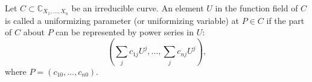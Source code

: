 Let $C \subset \mathbb{C}_{X_1, \ldots, X_n}$ be an irreducible curve. An element $U$ in the function field of $C$ is called a uniformizing parameter (or uniformizing variable) at $P \in C$ if the part of $C$ about $P$ can be represented by power series in $U$:
$$\left( \sum_j c_{1j} U^j, \ldots, \sum_j c_{nj} U^j \right),$$
where $P = (c_{10}, \ldots, c_{n0})$.
